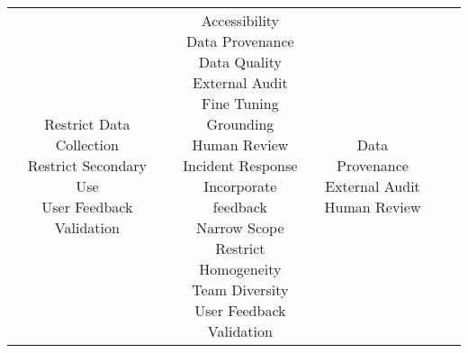 \documentclass[fleqn]{article}
\begin{document}
\begin{landscape}
\begin{table}[H]
\begin{tabular}{|c|c|c|c|c|}
{			\textbullet\hspace{3pt} Restrict Data Collection\\ 				
			\textbullet\hspace{3pt} Restrict Secondary Use\\ 		
			\textbullet\hspace{3pt} User Feedback\\ 	
			\textbullet\hspace{3pt} Validation\\ 		
		}
		& \makecell[l]{
			\textbullet\hspace{3pt} Accessibility \\ 	
			\textbullet\hspace{3pt} Data Provenance\\ 	
			\textbullet\hspace{3pt} Data Quality\\ 	
			\textbullet\hspace{3pt} External Audit\\ 	
			\textbullet\hspace{3pt} Fine Tuning\\ 	
			\textbullet\hspace{3pt} Grounding\\ 	
			\textbullet\hspace{3pt} Human Review \\ 	
			\textbullet\hspace{3pt} Incident Response\\ 	
			\textbullet\hspace{3pt} Incorporate feedback \\ 	
		 	\textbullet\hspace{3pt} Narrow Scope\\  
			\textbullet\hspace{3pt} Restrict Homogeneity\\ 			 	
			\textbullet\hspace{3pt} Team Diversity\\ 	
			\textbullet\hspace{3pt} User Feedback\\ 	
			\textbullet\hspace{3pt} Validation\\ 	
		}
		& \makecell[l]{
			\textbullet\hspace{3pt} Data Provenance\\ 
	 		\textbullet\hspace{3pt} External Audit\\ 		
			\textbullet\hspace{3pt} Human Review \\ 
}
\end{tabular}
\end{table}
\end{landscape}
\end{document}
